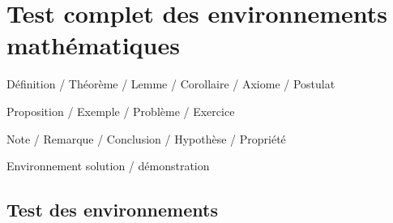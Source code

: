 \documentclass[fr]{../../elegantbook}
\begin{document}
\chapter{Test complet des environnements mathématiques}
\begin{introduction}
\item Définition / Théorème / Lemme / Corollaire / Axiome / Postulat
\item Proposition / Exemple / Problème / Exercice
\item Note / Remarque / Conclusion / Hypothèse / Propriété
\item Environnement solution / démonstration
\end{introduction}

\section{Test des environnements}
\end{document}
